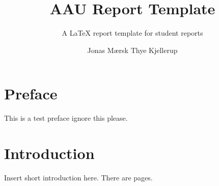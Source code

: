 \documentclass{aau-report}
\title{AAU Report Template}
\subtitle{A \LaTeX{} report template for student reports}
\author{Jonas Mærsk Thye Kjellerup}
\begin{document}
\frontmatter
\maketitle
\tableofcontents
\chapter{Preface}
This is a test preface ignore this please.

\mainmatter
\chapter{Introduction}
Insert short introduction here. There are \pageref{LastPage} pages.
\end{document}
